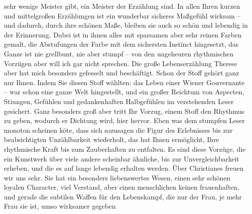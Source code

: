 \begin{ledgroupsized}[t]{13cm}
               sehr wenige Meister gibt, ein Meister der Erzählung sind. In allen Ihren kurzen und
               mittelgroßen Erzählungen ist ein wunderbar sicheres Maßgefühl wirksam – und dadurch,
               durch ihre schönen Maße, bleiben sie auch so schön und lebendig in der Erinnerung.
                  {\pb}Dabei ist in ihnen alles mit
               sparsamen aber sehr reinen Farben gemalt, die Abstufungen der Farbe mit dem
               sichersten Instinct hingesetzt, das Ganze ist nie grellbunt, nie aber stumpf – von
               den ungeheuren rhythmischen Vorzügen aber will ich gar nicht sprechen. Die große
               Lebenserzählung Therese aber hat mich besonders
               gefesselt und beschäftigt. Schon der Stoff gehört ganz nur Ihnen. Indem Sie diesen
               Stoff wählten: das Leben einer Wiener Gouvernante
               – war schon eine ganze Welt hingestellt, und ein großer Reichtum von Aspecten, Sti{\geminationm}ungen, Gefühlen und gedankenhaften Halbgefühlen im
               verstehenden Leser gesichert. Ganz besonders groß aber tritt Ihr Vorzug, einem Stoff
               den Rhythmus zu geben, wodurch er Dichtung wird, hier hervor. Eben was dem stumpfen
               Leser monoton scheinen kö{\geminationn}te, dass sich sozusagen die
               Figur des Erlebnisses bis zur beabsichtigten Unzählbarkeit wiederholt, das hat Ihnen
               ermöglicht, Ihre rhythmische Kraft bis zum Zauberhaften zu entfalten. Es sind diese
               Vorzüge, die ein Kunstwerk über viele andere scheinbar ähnliche, bis zur
               Unvergleichbarkeit erheben, und die {\pb}es auf lange lebendig erhalten
               werden.\pend
           \pstart
           Über Christianes \label{K_L02503-3v}\label{K_L02503-3h} freuen wir uns sehr. Sie
               hat ein besonders liebenswertes Wesen, einen sehr schönen loyalen Character, viel
               Verstand, aber einen menschlichen keinen frauenhaften, und gerade die subtilen Waffen
               für den Lebenskampf, die nur der Frau, je mehr Frau sie ist, umso wirksamer gegeben

\end{ledgroupsized}

